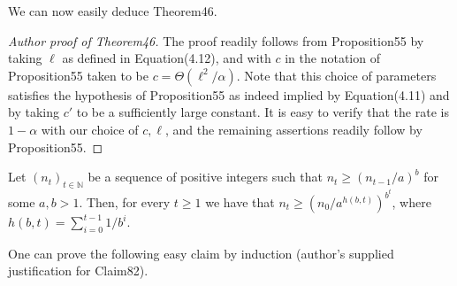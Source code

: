 We can now easily deduce Theorem46.
\begin{proof}[Author proof of Theorem46]
The proof readily follows from Proposition55 by taking $\ell$ as defined in Equation(4.12), and with $c$ in the notation of Proposition55 taken to be $c=\Theta(\ell^2/\alpha)$. Note that this choice of parameters satisfies the hypothesis of Proposition55 as indeed implied by Equation(4.11) and by taking $c'$ to be a sufficiently large constant. It is easy to verify that the rate is $1-\alpha$ with our choice of $c,\ell$, and the remaining assertions readily follow by Proposition55.
\end{proof}
\setcounter{nttheorem}{81}
\begin{ntclaim}
Let $(n_t)_{t\in\mathbb N}$ be a sequence of positive integers such that $n_t\geq(n_{t-1}/a)^b$ for some $a,b>1$. Then, for every $t\geq1$ we have that $n_t\geq(n_0/a^{h(b,t)})^{b^t}$, where $h(b,t)=\sum_{i=0}^{t-1}1/b^i$.
\end{ntclaim}
One can prove the following easy claim by induction (author's supplied justification for Claim82).
